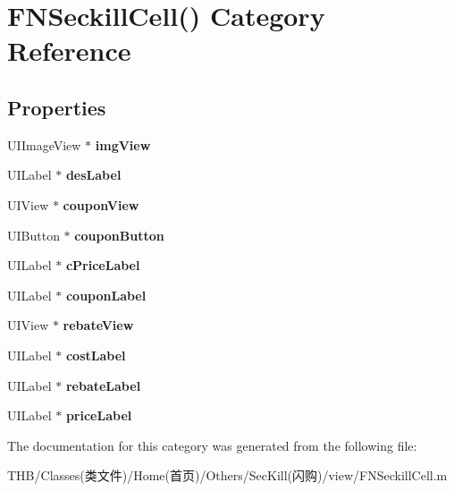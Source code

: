 \hypertarget{category_f_n_seckill_cell_07_08}{}\section{F\+N\+Seckill\+Cell() Category Reference}
\label{category_f_n_seckill_cell_07_08}
\subsection*{Properties}
\begin{DoxyCompactItemize}
\item 
\mbox{\label{category_f_n_seckill_cell_07_08_adaa00b51e5ab5b2c8923bdce0d527674}} 
U\+I\+Image\+View $\ast$ {\bfseries img\+View}
\item 
\mbox{\label{category_f_n_seckill_cell_07_08_a71865a72454a85943c8ab8b0210bbca6}} 
U\+I\+Label $\ast$ {\bfseries des\+Label}
\item 
\mbox{\label{category_f_n_seckill_cell_07_08_aa8989618ea73012c3af6f402f9213046}} 
U\+I\+View $\ast$ {\bfseries coupon\+View}
\item 
\mbox{\label{category_f_n_seckill_cell_07_08_adca2d88354fd8becbb41fa4137dacead}} 
U\+I\+Button $\ast$ {\bfseries coupon\+Button}
\item 
\mbox{\label{category_f_n_seckill_cell_07_08_ac69246339a8ddfdc905b62ca1b4a833e}} 
U\+I\+Label $\ast$ {\bfseries c\+Price\+Label}
\item 
\mbox{\label{category_f_n_seckill_cell_07_08_a0ddd78e697a6b7ae565498402ccbcd12}} 
U\+I\+Label $\ast$ {\bfseries coupon\+Label}
\item 
\mbox{\label{category_f_n_seckill_cell_07_08_aaddb5640cb4d30535c262715bd832045}} 
U\+I\+View $\ast$ {\bfseries rebate\+View}
\item 
\mbox{\label{category_f_n_seckill_cell_07_08_a7d3395c4808067a7da0603dace064a8b}} 
U\+I\+Label $\ast$ {\bfseries cost\+Label}
\item 
\mbox{\label{category_f_n_seckill_cell_07_08_a6fb14c54e1029cd105166ddb699e714e}} 
U\+I\+Label $\ast$ {\bfseries rebate\+Label}
\item 
\mbox{\label{category_f_n_seckill_cell_07_08_afdb0d2603557d02bdab0c7b466034345}} 
U\+I\+Label $\ast$ {\bfseries price\+Label}
\end{DoxyCompactItemize}


The documentation for this category was generated from the following file\+:\begin{DoxyCompactItemize}
\item 
T\+H\+B/\+Classes(类文件)/\+Home(首页)/\+Others/\+Sec\+Kill(闪购)/view/F\+N\+Seckill\+Cell.\+m\end{DoxyCompactItemize}
